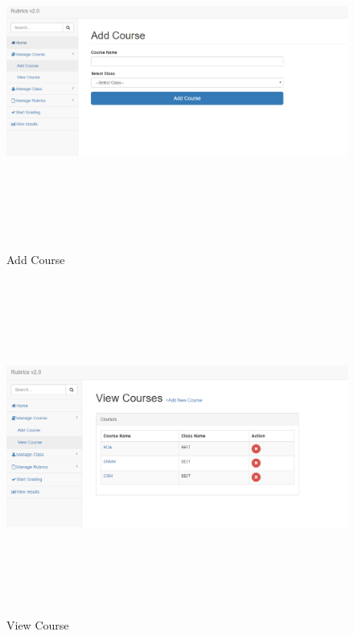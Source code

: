 \begin{figure}[!h]
\begin{minipage}[t]{0.5\linewidth}
    \centering
\hfill\includegraphics[width=17cm, height=11cm]{project/12}\hspace*{\fill}
    \caption{Add Course}
    \label{f1}
\end{minipage}        
\end{figure} 

\begin{figure}[!h]
\begin{minipage}[t]{0.5\linewidth}
    \centering
\hfill\includegraphics[width=17cm, height=11cm]{project/13}\hspace*{\fill}
    \caption{View Course}
    \label{f1}
\end{minipage}        
\end{figure}

